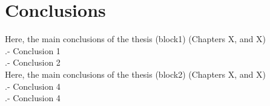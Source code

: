 %
%
\chapter{Conclusions}


\noindent Here, the main conclusions of the thesis (block1) (Chapters X, and X)\\

.- Conclusion 1 \\ 

.- Conclusion 2 \\ 


\noindent Here, the main conclusions of the thesis (block2) (Chapters X, and X)\\

.- Conclusion 4 \\

.- Conclusion 4 \\





